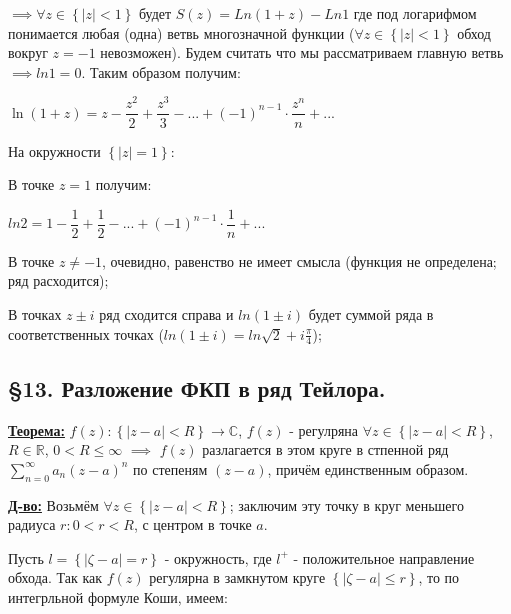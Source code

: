 \documentclass[a4paper, 12pt]{article}
\begin{document}
  $\implies \forall z \in \left\{ |z| < 1\right\}$ будет $S(z) = Ln(1+z) - Ln1$ где под логарифмом понимается любая (одна) ветвь многозначной функции ($\forall z \in \left\{ |z| < 1 \right\}$ обход вокруг $z=-1$ невозможен). Будем считать что мы рассматриваем главную ветвь $\implies ln1 = 0$. Таким образом получим:

  \begin{center}
    $\ln(1+z) = z - \dfrac{z^2}{2} + \dfrac{z^3}{3} - ... + (-1)^{n-1}\cdot \dfrac{z^n}{n} + ...$
  \end{center}

  \quad На окружности $\left\{ |z| = 1 \right\}$:

  \quad В точке $z = 1$ получим:

  \begin{center}
    $ln 2 = 1 - \dfrac{1}{2} + \dfrac{1}{2} - ... + (-1)^{n-1} \cdot \dfrac{1}{n} + ...$
  \end{center}

  \quad В точке $z \neq -1 $, очевидно, равенство не имеет смысла (функция не определена; ряд расходится);

  \quad В точках $z \pm i $ ряд сходится справа и $ln(1\pm i)$ будет суммой ряда в соответственных точках ($ln(1 \pm i) = ln\sqrt{2} + i\frac{\pi}{4}$); 

  \begin{center}
    \subsection*{\S13. Разложение ФКП в ряд Тейлора. }
  \end{center}

  \quad \textbf{\underline{Теорема:}} $f(z): \left\{ |z - a| < R \right\} \rightarrow \mathbb{C}$, $f(z)$ - регулряна $\forall z \in \left\{ |z - a| < R\right\}$, $R \in \mathbb{R}$, $0 < R \leq \infty$ $\implies$ $f(z)$ разлагается в этом круге в стпенной ряд $\displaystyle\sum\limits_{n=0}^{\infty} a_n (z-a)^n$ по степеням $(z - a)$, причём единственным образом.

  \quad \textbf{\underline{Д-во:}} Возьмём $\forall z \in \left\{ |z-a| < R \right\}$; заключим эту точку в круг меньшего радиуса $r : 0 < r < R$, с центром в точке $a$. 

  \quad Пусть $l = \left\{ |\zeta - a| = r \right\}$ - окружность, где $l^+ $ - положительное направление обхода. Так как $f(z)$ регулярна в замкнутом круге $\left\{ |\zeta - a| \leq r \right\}$, то по интегрльной формуле Коши, имеем:\newline
\end{document}
